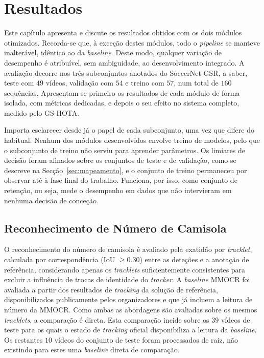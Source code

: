 \chapter{Resultados}
\label{cap:resultados}

Este capítulo apresenta e discute os resultados obtidos com os dois módulos otimizados.
Recorda-se que, à exceção destes módulos, todo o \emph{pipeline} se manteve inalterável,
idêntico ao da \emph{baseline}. Deste modo, qualquer variação de desempenho é atribuível,
sem ambiguidade, ao desenvolvimento integrado. A avaliação decorre nos três subconjuntos
anotados do SoccerNet-GSR, a saber, teste com $49$ vídeos, validação com $54$ e treino com
$57$, num total de $160$ sequências. Apresentam-se primeiro os resultados de cada módulo de
forma isolada, com métricas dedicadas, e depois o seu efeito no sistema completo, medido
pelo GS-HOTA.

Importa esclarecer desde já o papel de cada subconjunto, uma vez que difere do habitual.
Nenhum dos módulos desenvolvidos envolve treino de modelos, pelo que o subconjunto de
treino não serviu para aprender parâmetros. Os limiares de decisão foram afinados sobre os
conjuntos de teste e de validação, como se descreve na Secção~\ref{sec:mapeamento}, e o
conjunto de treino permaneceu por observar até à fase final do trabalho. Funciona, por
isso, como conjunto de retenção, ou seja, mede o desempenho em dados que não intervieram
em nenhuma decisão de conceção.


\section{Reconhecimento de Número de Camisola}
\label{sec:res_jnr}

O reconhecimento do número de camisola é avaliado pela exatidão por \emph{tracklet},
calculada por correspondência (IoU $\geq 0.30$) entre as deteções e a anotação de
referência, considerando apenas os \emph{tracklets} suficientemente consistentes para
excluir a influência de trocas de identidade do \emph{tracker}. A \emph{baseline} MMOCR
foi avaliada a partir dos resultados de \emph{tracking} da solução de referência,
disponibilizados publicamente pelos organizadores e que já incluem a leitura de número da
MMOCR. Como ambas as abordagens são avaliadas sobre os mesmos \emph{tracklets}, a
comparação é direta. Esta comparação incide sobre os $39$ vídeos de teste para os quais o
estado de \emph{tracking} oficial disponibiliza a leitura da \emph{baseline}. Os restantes
$10$ vídeos do conjunto de teste foram processados de raiz, não existindo para estes uma
\emph{baseline} direta de comparação.

